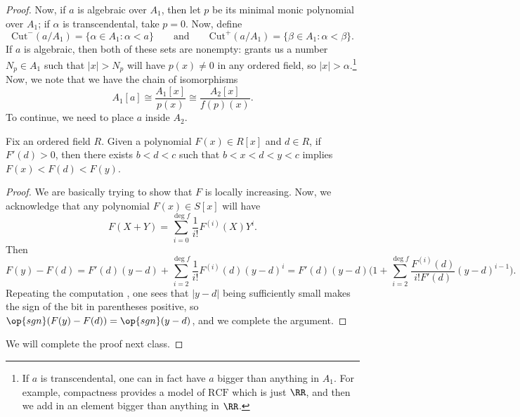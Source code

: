 \documentclass[../notes.tex]{subfiles}
\begin{document}
\begin{proof}
	Now, if $a$ is algebraic over $A_1$, then let $p$ be its minimal monic polynomial over $A_1$; if $\alpha$ is transcendental, take $p=0$. Now, define
	\[\mathrm{Cut}^-(a/A_1)=\{\alpha\in A_1:\alpha<a\}\qquad\text{and}\qquad\mathrm{Cut}^+(a/A_1)=\{\beta\in A_1:\alpha<\beta\}.\]
	If $a$ is algebraic, then both of these sets are nonempty:  grants us a number $N_p\in A_1$ such that $\left|x\right|>N_p$ will have $p(x)\ne0$ in any ordered field, so $\left|x\right|>\alpha$.\footnote{If $a$ is transcendental, one can in fact have $a$ bigger than anything in $A_1$. For example, compactness provides a model of $\mathrm{RCF}$ which is just $\RR$, and then we add in an element bigger than anything in $\RR$.} Now, we note that we have the chain of isomorphisms
	\[A_1[a]\cong\frac{A_1[x]}{p(x)}\cong\frac{A_2[x]}{f(p)(x)}.\]
	To continue, we need to place $a$ inside $A_2$.
	\begin{proposition} \label{prop:poly-increases-locally}
		Fix an ordered field $R$. Given a polynomial $F(x)\in R[x]$ and $d\in R$, if $F'(d)>0$, then there exists $b<d<c$ such that $b<x<d<y<c$ implies $F(x)<F(d)<F(y)$.
	\end{proposition}
	\begin{proof}
		We are basically trying to show that $F$ is locally increasing. Now, we acknowledge that any polynomial $F(x)\in S[x]$ will have
		\[F(X+Y)=\sum_{i=0}^{\deg f}\frac1{i!}F^{(i)}(X)Y^i.\]
		Then
		\[F(y)-F(d)=F'(d)(y-d)+\sum_{i=2}^{\deg f}\frac1{i!}F^{(i)}(d)(y-d)^i=F'(d)(y-d)\Bigg(1+\sum_{i=2}^{\deg f}\frac{F^{(i)}(d)}{i!F'(d)}(y-d)^{i-1}\Bigg).\]
		Repeating the computation , one sees that $\left|y-d\right|$ being sufficiently small makes the sign of the bit in parentheses positive, so $\op{sgn}(F(y)-F(d))=\op{sgn}(y-d)$, and we complete the argument.
	\end{proof}
	We will complete the proof next class.
\end{proof}
\end{document}

